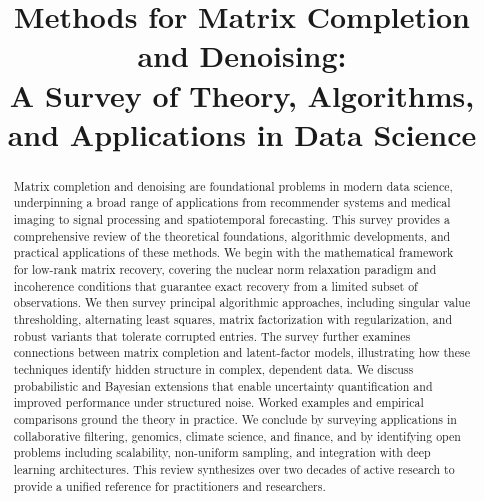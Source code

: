 \documentclass[conference]{IEEEtran}
\begin{document}
\title{Methods for Matrix Completion and Denoising:\\
A Survey of Theory, Algorithms, and Applications in Data Science}

\author{
\and
{}
}

\maketitle

\begin{abstract}
Matrix completion and denoising are foundational problems in modern data science, underpinning a broad range of applications from recommender systems and medical imaging to signal processing and spatiotemporal forecasting. This survey provides a comprehensive review of the theoretical foundations, algorithmic developments, and practical applications of these methods. We begin with the mathematical framework for low-rank matrix recovery, covering the nuclear norm relaxation paradigm and incoherence conditions that guarantee exact recovery from a limited subset of observations. We then survey principal algorithmic approaches, including singular value thresholding, alternating least squares, matrix factorization with regularization, and robust variants that tolerate corrupted entries. The survey further examines connections between matrix completion and latent-factor models, illustrating how these techniques identify hidden structure in complex, dependent data. We discuss probabilistic and Bayesian extensions that enable uncertainty quantification and improved performance under structured noise. Worked examples and empirical comparisons ground the theory in practice. We conclude by surveying applications in collaborative filtering, genomics, climate science, and finance, and by identifying open problems including scalability, non-uniform sampling, and integration with deep learning architectures. This review synthesizes over two decades of active research to provide a unified reference for practitioners and researchers.
\end{abstract}
\end{document}
